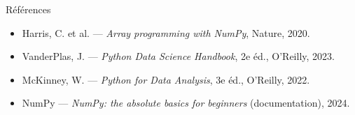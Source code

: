 \documentclass[aspectratio=169,11pt]{beamer}
\begin{document}
\begin{frame}{Références}
\begin{itemize}\small
  \item Harris, C. et al. — \emph{Array programming with NumPy}, Nature, 2020.
  \item VanderPlas, J. — \emph{Python Data Science Handbook}, 2e éd., O'Reilly, 2023.
  \item McKinney, W. — \emph{Python for Data Analysis}, 3e éd., O'Reilly, 2022.
  \item NumPy — \emph{NumPy: the absolute basics for beginners} (documentation), 2024.
\end{itemize}
\end{frame}
\end{document}
